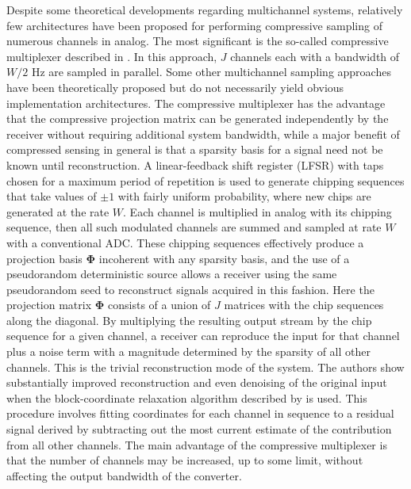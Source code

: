 \documentclass[11pt]{paper}
\begin{document}
Despite some theoretical developments regarding multichannel systems,
relatively few architectures have been proposed for performing compressive
sampling of numerous channels in analog. The most significant is the
so-called compressive multiplexer described in \cite{slavinsky2011}. In 
this approach, $J$ channels each with a bandwidth of $W/2$ Hz are sampled
in parallel. Some other multichannel sampling approaches have been 
theoretically proposed \cite{eldar2009} but do not necessarily yield obvious
implementation architectures. The compressive multiplexer has the advantage
that the compressive projection matrix can be generated independently by the
receiver without requiring additional system bandwidth, while a major 
benefit of compressed sensing in general is that a sparsity basis for a
signal need not be known until reconstruction. A linear-feedback shift 
register (LFSR) with taps chosen for
a maximum period of repetition is used to generate chipping sequences that 
take values of $\pm 1$ with fairly uniform probability, where new chips are
generated at the rate $W$. Each channel is multiplied in analog with its 
chipping sequence, then all such modulated channels are summed and sampled 
at rate $W$ with a conventional ADC. These chipping sequences effectively 
produce a projection basis $\mathbf{\Phi}$ incoherent with any sparsity 
basis, and the use of a pseudorandom deterministic source allows a receiver
using the same pseudorandom seed to reconstruct signals acquired in this 
fashion. Here the projection matrix $\mathbf{\Phi}$ consists of a union of
$J$ matrices with the chip sequences along the diagonal. By multiplying the 
resulting output stream by the chip sequence for a 
given channel, a receiver can reproduce the input for that channel plus a
noise term with a magnitude determined by the sparsity of all other 
channels. This is the trivial reconstruction mode of the system. The 
authors show substantially improved reconstruction and even denoising of
the original input when the block-coordinate relaxation algorithm described 
by \cite{sylvain2000} is used. This procedure involves fitting coordinates 
for each channel in sequence to a residual signal derived by subtracting out
the most current estimate of the contribution from all other channels. The
main advantage of the compressive multiplexer is that the number of channels
may be increased, up to some limit, without affecting the output bandwidth 
of the converter.
\end{document}
